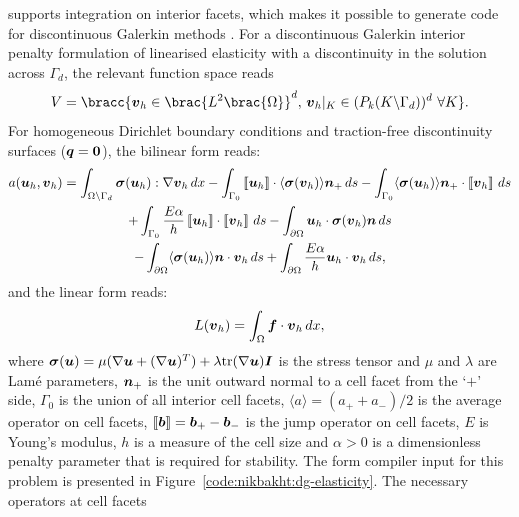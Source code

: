\ffc{} supports integration on interior facets, which makes
it possible to generate code for discontinuous Galerkin methods
\citep{OelgaardLoggWells2008}.  For a discontinuous Galerkin interior
penalty formulation of linearised elasticity with a discontinuity in
the solution across $\Gamma_{d}$, the relevant function space reads
%
\begin{equation}
 V = \bracc{\vect{v}_{h} \in \brac{L^{2}\brac{\Omega}}^{d}, \,
            \vect{v}_{h}|_K \in (P_{k}(K\backslash\Gamma_{d}))^{d} \ \forall K}.
\end{equation}
%
For homogeneous Dirichlet boundary conditions and traction-free
discontinuity surfaces ($\boldsymbol{q} = \boldsymbol{0}$), the bilinear form reads:
%
\begin{multline}
 a(\boldsymbol{u}_{h}, \boldsymbol{v}_{h}) = \int_{\Omega \backslash \Gamma_{d}} \boldsymbol{\sigma}(\boldsymbol{u}_{h})
                                :  \nabla \boldsymbol{v}_{h} \, d x
 -  \int_{\Gamma_0} \left\llbracket {\boldsymbol{u}_{h}} \right\rrbracket \cdot \langle \boldsymbol{\sigma}(\boldsymbol{v}_{h}) \rangle \boldsymbol{n}_{+} \, d s
 - \int_{\Gamma_{0}} \langle \boldsymbol{\sigma}(\boldsymbol{u}_{h}) \rangle \boldsymbol{n}_{+} \cdot \left\llbracket {\boldsymbol{v}_{h}} \right\rrbracket  \, d s
\\
 + \int_{\Gamma_0} \frac{E \alpha}{h}  \left\llbracket {\boldsymbol{u}_{h}} \right\rrbracket \cdot \left\llbracket {\boldsymbol{v}_{h}} \right\rrbracket \, d s
 -  \int_{\partial \Omega} \boldsymbol{u}_{h} \cdot \boldsymbol{\sigma}(\boldsymbol{v}_{h})\boldsymbol{n} \, d s
\\
 - \int_{\partial \Omega} \langle \boldsymbol{\sigma}(\boldsymbol{u}_{h}) \rangle \boldsymbol{n} \cdot \boldsymbol{v}_{h}  \, d s
 + \int_{\partial \Omega} \frac{E \alpha}{h}  \boldsymbol{u}_{h} \cdot \boldsymbol{v}_{h} \, d s,
\end{multline}
%
and the linear form reads:
%
\begin{equation}
 L(\boldsymbol{v}_{h}) = \int_{\Omega} \boldsymbol{f} \cdot \boldsymbol{v}_{h} \, d x,
\end{equation}
%
where
$\boldsymbol{\sigma}(\boldsymbol{u})
= \mu(\nabla\boldsymbol{u} + (\nabla \boldsymbol{u})^{T} )
+ \lambda {\rm tr}(\nabla \boldsymbol{u}) \boldsymbol{I}$
is the stress tensor and $\mu$ and $\lambda$ are Lam\'e parameters,
$\boldsymbol{n}_{+}$ is the unit outward normal to a cell facet from the `$+$' side,
$\Gamma_0$ is the union of all interior cell facets,
$\langle a \rangle = (a_{+} + a_{-})/2$ is the  average operator on cell facets,
$\left\llbracket {\boldsymbol{b}} \right\rrbracket = \boldsymbol{b}_{+} - \boldsymbol{b}_{-}$ is the jump operator on cell facets,
$E$ is Young's modulus, $h$ is a measure of the cell size
and $\alpha > 0$ is a dimensionless penalty parameter that
is required for stability.
The form compiler input for this problem is presented in
Figure~\ref{code:nikbakht:dg-elasticity}. The necessary operators at cell facets

